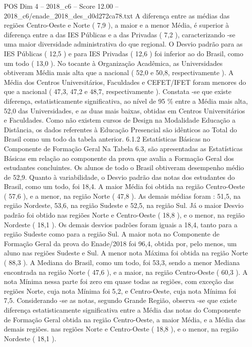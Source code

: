 \begin{textsample}{POS Dim 4 – 2018\_c6 – Score 12.00 – 2018\_c6/enade\_2018\_des\_d0d272ca78.txt}
A diferença entre as médias das regiões Centro-Oeste e Norte ( 7,9 ), a maior e a menor Média, é superior à diferença entre a das IES Públicas e a das Privadas ( 7,2 ), caracterizando -se uma maior diversidade administrativa do que regional.
O Desvio padrão para as IES Públicas ( 12,5 ) e para IES Privadas ( 12,6 ) foi inferior ao do Brasil, como um todo ( 13,0 ).
No tocante à Organização Acadêmica, as Universidades obtiveram Média mais alta que a nacional ( 52,0 e 50,8, respectivamente ).
A Média dos Centros Universitários, Faculdades e CEFET/IFET foram menores do que a nacional ( 47,3, 47,2 e 48,7, respectivamente ).
Constata -se que existe diferença, estatisticamente significativa, ao nível de 95 \% entre a Média mais alta, 52,0 das Universidades, e as duas mais baixas, obtidas em Centros Universitários e Faculdades.
Como não existem cursos de Design na Modalidade Educação a Distância, os dados referentes à Educação Presencial são idênticos ao Total do Brasil como um todo da tabela anterior. 6.1.2 Estatísticas Básicas no Componente de Formação Geral Na Tabela 6.3, são apresentadas as Estatísticas Básicas em relação ao componente da prova que avalia a Formação Geral dos estudantes concluintes.
Os alunos de todo o Brasil obtiveram desempenho médio de 52,9.
Quanto à variabilidade, o Desvio padrão das notas dos estudantes do Brasil, como um todo, foi 18,4.
A maior Média foi obtida na região Centro-Oeste ( 57,6 ), e a menor, na região Norte ( 47,8 ).
As demais médias foram : 51,5, na região Nordeste, 53,6, na região Sudeste e 52,5, na região Sul.
Já o maior Desvio padrão foi obtido nas regiões Norte e Centro-Oeste ( 18,8 ), e o menor, na região Nordeste ( 18,1 ).
Os demais desvios padrões foram iguais a 18,4, tanto para a região Sudeste como para a região Sul.
A maior nota no Componente de Formação Geral da prova do Enade/2018 foi 96,4, obtida por, pelo menos, um aluno nas regiões Sudeste e Sul.
A menor nota Máxima foi obtida na região Norte ( 88,3 ).
A Mediana do Brasil, como um todo, foi 53,3, sendo a menor Mediana encontrada na região Norte ( 47,6 ), e a maior, na região Centro-Oeste ( 60,3 ).
A nota Mínima nessa parte foi zero em quase todas as regiões, com exceção das regiões Norte, cuja nota Mínima foi 5,2, e Centro-Oeste, cuja nota Mínima foi 7,5.
Considerando -se as notas, segundo Grande Região, observa -se que existe diferença estatisticamente significativa entre a Média das notas do Componente de Formação Geral obtida na região Centro-Oeste, a maior Média, e a Média das demais regiões. nas regiões Norte e Centro-Oeste ( 18,8 ), e o menor, na região Nordeste ( 18,1 ).

\end{textsample}
